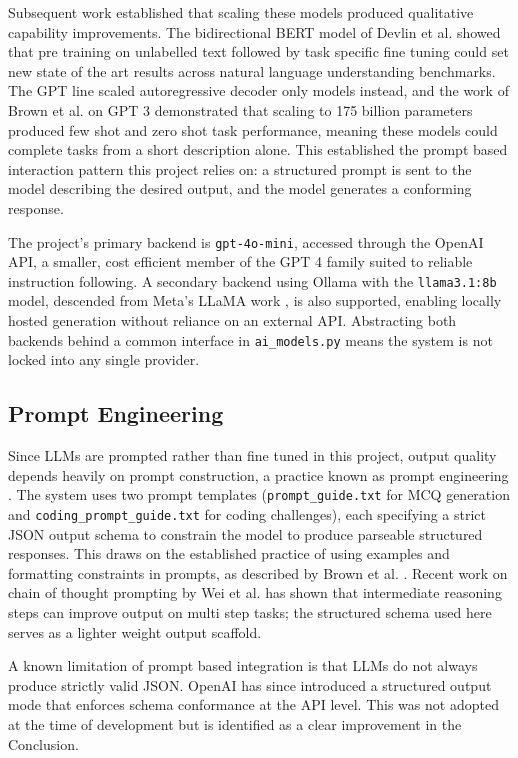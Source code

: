 Subsequent work established that scaling these models produced
qualitative capability improvements. The bidirectional BERT model of
Devlin et al. \cite{devlin2019bert} showed that pre training on
unlabelled text followed by task specific fine tuning could set new
state of the art results across natural language understanding
benchmarks. The GPT line scaled autoregressive decoder only models
instead, and the work of Brown et al. \cite{brown2020gpt3} on GPT 3
demonstrated that scaling to 175 billion parameters produced few shot
and zero shot task performance, meaning these models could complete
tasks from a short description alone. This established the prompt
based interaction pattern this project relies on: a structured prompt
is sent to the model describing the desired output, and the model
generates a conforming response.

The project's primary backend is \texttt{gpt-4o-mini}, accessed through
the OpenAI API, a smaller, cost efficient member of the GPT 4 family
suited to reliable instruction following. A secondary backend using
Ollama \cite{ollama2025} with the \texttt{llama3.1:8b} model, descended
from Meta's LLaMA work \cite{touvron2023llama}, is also supported,
enabling locally hosted generation without reliance on an external API.
Abstracting both backends behind a common interface in
\texttt{ai\_models.py} means the system is not locked into any single
provider.

\subsection{Prompt Engineering}

Since LLMs are prompted rather than fine tuned in this project, output
quality depends heavily on prompt construction, a practice known as
prompt engineering \cite{liu2023promptsurvey}. The system uses two
prompt templates (\texttt{prompt\_guide.txt} for MCQ generation and
\texttt{coding\_prompt\_guide.txt} for coding challenges), each
specifying a strict JSON output schema to constrain the model to
produce parseable structured responses. This draws on the established
practice of using examples and formatting constraints in prompts, as
described by Brown et al. \cite{brown2020gpt3}. Recent work on chain
of thought prompting by Wei et al. \cite{wei2022chainofthought} has
shown that intermediate reasoning steps can improve output on multi
step tasks; the structured schema used here serves as a lighter weight
output scaffold.

A known limitation of prompt based integration is that LLMs do not
always produce strictly valid JSON. OpenAI has since introduced a
structured output mode \cite{openai2024structured} that enforces schema
conformance at the API level. This was not adopted at the time of
development but is identified as a clear improvement in the Conclusion.

